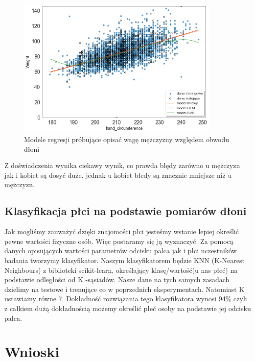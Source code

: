 \documentclass{article}
\begin{document}
\begin{figure}[H]
    \centering
    \includegraphics[width=10cm]{modelregresjiwaga_men.png}
    \caption{Modele regresji próbujące opisać wagę mężczyzny względem obwodu dłoni}
    \label{fig:my_img}
\end{figure}

Z doświadczenia wynika ciekawy wynik, co prawda błędy zarówno u mężczyzn jak i kobiet są dosyć duże, jednak u kobiet błedy są znacznie mniejsze niż u mężczyzn.




\subsection{Klasyfikacja płci na podstawie pomiarów dłoni}
Jak mogliśmy zauważyć dzięki znajomości płci jesteśmy wstanie lepiej określić pewne wartości fizyczne osób. Więc postaramy się ją wyznaczyć. Za pomocą danych opisujących wartości parametrów odcisku palca jak i płci uczestników badania tworzymy klasyfikator. Naszym klasyfikatorem będzie KNN (K-Nearest Neighbours) z biblioteki scikit-learn, określający klasę/wartość(u nas płeć) na podstawie odległości od K -sąsiadów. Nasze dane na tych samych zasadach dzielimy na testowe i trenujące co w poprzednich eksperymentach. Natomiast K ustawiamy równe 7.
Dokładność rozwiązania tego klasyfikatora wynosi 94\% czyli z całkiem dużą dokładnością możemy określić płeć osoby na podstawie jej odcisku palca.





\section{Wnioski}
\end{document}
